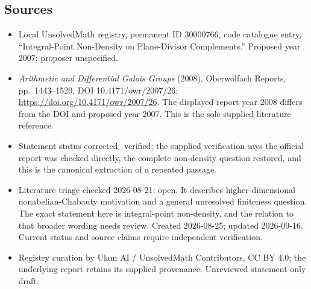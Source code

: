\documentclass[11pt]{article}
\begin{document}
\subsection{Sources}
\begin{itemize}
\item Local UnsolvedMath registry, permanent ID 30000766, code catalogue entry, ``Integral-Point Non-Density on Plane-Divisor Complements.'' Proposed year 2007; proposer unspecified.
\item \emph{Arithmetic and Differential Galois Groups} (2008), Oberwolfach Reports, pp.\ 1443--1520, DOI 10.4171/owr/2007/26; \url{https://doi.org/10.4171/owr/2007/26}. The displayed report year 2008 differs from the DOI and proposed year 2007. This is the sole supplied literature reference.
\item Statement status corrected\_verified; the supplied verification says the official report was checked directly, the complete non-density question restored, and this is the canonical extraction of a repeated passage.
\item Literature triage checked 2026-08-21: open. It describes higher-dimensional nonabelian-Chabauty motivation and a general unresolved finiteness question. The exact statement here is integral-point non-density, and the relation to that broader wording needs review. Created 2026-08-25; updated 2026-09-16. Current status and source claims require independent verification.
\item Registry curation by Ulam AI / UnsolvedMath Contributors, CC BY 4.0; the underlying report retains its supplied provenance. Unreviewed statement-only draft.
\end{itemize}
\end{document}
